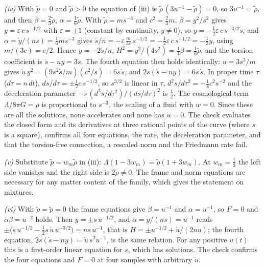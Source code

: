 \emph{(iv)} With $\tilde p = 0$ and $\tilde\rho > 0$ the equation of (iii) is $\tilde\rho\,(3u^{-1} - \tilde\rho) = 0$, so $3u^{-1} = \tilde\rho$, and then $\beta = \tfrac23\tilde\rho$, $\alpha = \tfrac16\tilde\rho$. With $\tilde\rho = m s^{-3}$ and $c^{2} = \tfrac23 m$, $\beta = y^{2}/s^{2}$ gives $y = \varepsilon\,c\,s^{-1/2}$ with $\varepsilon = \pm1$ (constant by continuity, $y \neq 0$), so $\dot y = -\tfrac12\varepsilon\,c\,s^{-3/2}\dot s$, and $\alpha = \dot y/(ns) = \tfrac16 m s^{-3}$ gives $\dot s/n = -\varepsilon\,\tfrac{m}{3c}\,s^{-1/2} = -\tfrac12\varepsilon\,c\,s^{-1/2} = -\tfrac12 y$, using $m/(3c) = c/2$. Hence $y = -2\dot s/n$, $H^{2} = y^{2}/(4s^{2}) = \tfrac14\beta = \tfrac16\tilde\rho$, and the torsion coefficient is $\dot s - n y = 3\dot s$. The fourth equation then holds identically: $u = 3s^{3}/m$ gives $\dot u\,y^{2} = (9 s^{2}\dot s/m)(c^{2}/s) = 6 s\,\dot s$, and $2s(\dot s - n y) = 6 s\,\dot s$. In proper time $\tau$ ($d\tau = n\,dt$), $ds/d\tau = \pm\tfrac12 c\,s^{-1/2}$, so $s^{3/2}$ is linear in $\tau$, $d^{2}s/d\tau^{2} = -\tfrac18 c^{2}s^{-2}$ and the deceleration parameter $-s\,(d^{2}s/d\tau^{2})/(ds/d\tau)^{2}$ is $\tfrac12$. The cosmological term $\Lambda/8\pi G = \rho$ is proportional to $s^{-3}$, the scaling of a fluid with $w = 0$. Since these are all the solutions, none accelerates and none has $\dot u = 0$. The check evaluates the closed form and its derivatives at three rational points of the curve (where $s$ is a square), confirms all four equations, the rate, the deceleration parameter, and that the torsion-free connection, a rescaled norm and the Friedmann rate fail.

\emph{(v)} Substitute $\tilde p = w_{m}\tilde\rho$ in (iii): $\Lambda(1 - 3w_{m}) = \tilde\rho(1 + 3w_{m})$. At $w_{m} = \tfrac13$ the left side vanishes and the right side is $2\tilde\rho \neq 0$. The frame and norm equations are necessary for any matter content of the family, which gives the statement on mixtures.

\emph{(vi)} With $\tilde\rho = \tilde p = 0$ the frame equations give $\beta = u^{-1}$ and $\alpha = u^{-1}$, so $F = 0$ and $\alpha\beta = u^{-2}$ holds. Then $y = \pm s\,u^{-1/2}$, and $\alpha = \dot y/(ns) = u^{-1}$ reads $\pm\bigl(\dot s\,u^{-1/2} - \tfrac12 s\,\dot u\,u^{-3/2}\bigr) = n s\,u^{-1}$, that is $H = \pm u^{-1/2} + \dot u/(2nu)$; the fourth equation, $2s(\dot s - n y) = \dot u\,s^{2}u^{-1}$, is the same relation. For any positive $u(t)$ this is a first-order linear equation for $s$, which has solutions. The check confirms the four equations and $F = 0$ at four samples with arbitrary $\dot u$.

